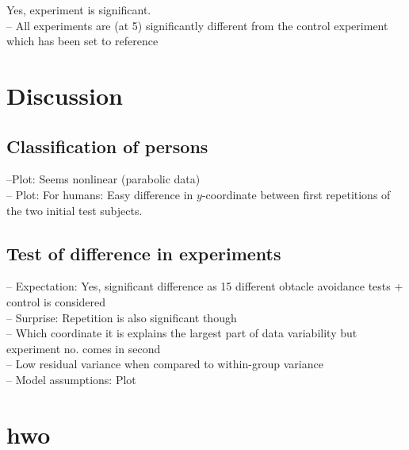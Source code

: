 \documentclass[12pt,fleqn]{article}
\begin{document}
Yes, experiment is significant.\\
	
-- All experiments are (at 5\pro) significantly different from the control experiment which has been set to reference

\section{Discussion}
\subsection{Classification of persons}
--Plot: Seems nonlinear (parabolic data)\\
-- Plot: For humans: Easy difference in \(y\)-coordinate between first repetitions of the two initial test subjects.

\subsection{Test of difference in experiments}
-- Expectation: Yes, significant difference as 15 different obtacle avoidance tests + control is considered\\
-- Surprise: Repetition is also significant though\\
-- Which coordinate it is explains the largest part of data variability but experiment no. comes in second\\
-- Low residual variance when compared to within-group variance\\
-- Model assumptions: Plot\\

\appendix
\section{hwo}
\begin{figure}[H]
	
	\centering
\end{figure}
\end{document}
